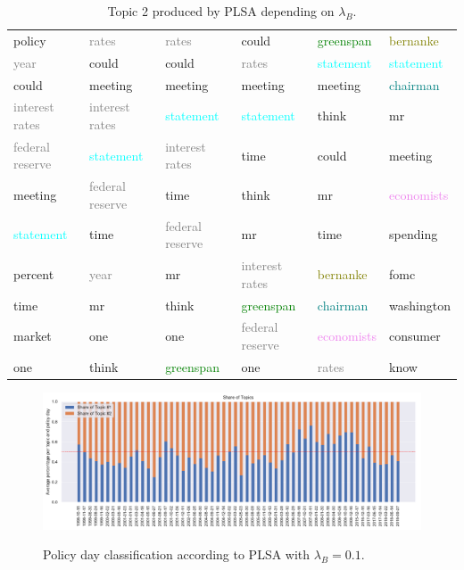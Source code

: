 \documentclass[11pt,a4paper,english,oneside]{book}
\numberwithin{equation}{chapter}
\begin{document}
\begin{table}
\begin{tabular}{ p{3cm}  p{3cm}  p{3cm}  p{3cm}  p{3cm}  p{3cm}}
		policy 							& \textcolor{gray}{rates} 			& \textcolor{gray}{rates} 			& could 							& \textcolor{green}{greenspan}	& \textcolor{olive}{bernanke} \\
		\textcolor{gray}{year}			& could 							& could 							& \textcolor{gray}{rates} 			&\textcolor{cyan}{statement}	& \textcolor{cyan}{statement} \\
		could 							& meeting 							& meeting 							& meeting 							&meeting 						& \textcolor{teal}{chairman} \\
		\textcolor{gray}{interest rates}& \textcolor{gray}{interest rates}	& \textcolor{cyan}{statement}		& \textcolor{cyan}{statement}		&think 							& mr \\
		\textcolor{gray}{federal reserve}& \textcolor{cyan}{statement}		& \textcolor{gray}{interest rates}	& time 								&could 							& meeting \\
		meeting 						& \textcolor{gray}{federal reserve}	& time 								& think 							&mr 							& \textcolor{violet}{economists} \\
		\textcolor{cyan}{statement}		& time 								& \textcolor{gray}{federal reserve}	& mr 								&time 							& spending \\
		percent 						& \textcolor{gray}{year}			& mr   								& \textcolor{gray}{interest rates}	&\textcolor{olive}{bernanke}& fomc \\
		time 							& mr 								& think   							& \textcolor{green}{greenspan}		&\textcolor{teal}{chairman} 	& washington \\
		market 							& one 								& one  								& \textcolor{gray}{federal reserve}	&\textcolor{violet}{economists}	& consumer \\
		one 							& think 							& \textcolor{green}{greenspan} 		& one 								&\textcolor{gray}{rates  }		& know \\		  
		\bottomrule %
	\end{tabular}
	\caption{Topic 2 produced by PLSA depending on $\lambda_B$.} %
	\label{tab:topics3} %
\end{table}

\begin{figure}
	\caption{Policy day classification according to PLSA with $\lambda_B = 0.1$.}
	\centering
	\includegraphics[scale=0.8]{Images/plsamodelling_bgLamb_0_1.pdf}
	\label{classPLSAL01}
\end{figure}
\end{document}

